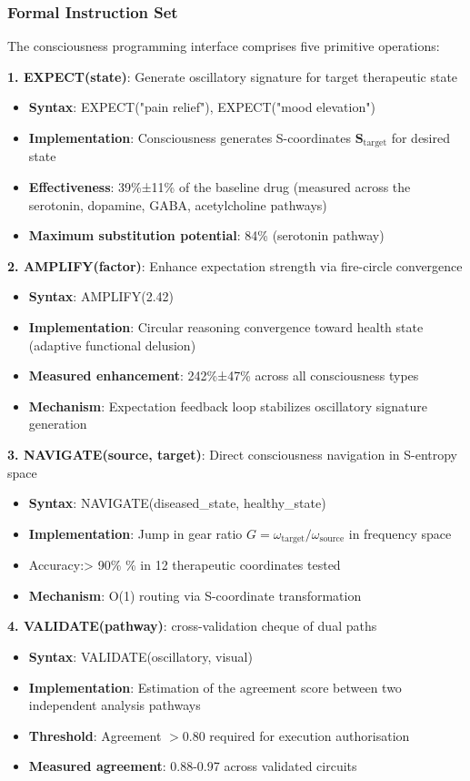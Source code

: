 \documentclass{article}
\theoremstyle{definition}
\theoremstyle{remark}
\begin{document}
\subsubsection{Formal Instruction Set}

The consciousness programming interface comprises five primitive operations:

\textbf{1. EXPECT(state)}: Generate oscillatory signature for target therapeutic state
\begin{itemize}
\item \textbf{Syntax}: EXPECT("pain relief"), EXPECT("mood elevation")
\item \textbf{Implementation}: Consciousness generates S-coordinates $\mathbf{S}_{\text{target}}$ for desired state
\item \textbf{Effectiveness}: 39\%±11\% of the baseline drug (measured across the serotonin, dopamine, GABA, acetylcholine pathways)
\item \textbf{Maximum substitution potential}: 84\% (serotonin pathway)
\end{itemize}

\textbf{2. AMPLIFY(factor)}: Enhance expectation strength via fire-circle convergence
\begin{itemize}
\item \textbf{Syntax}: AMPLIFY(2.42)
\item \textbf{Implementation}: Circular reasoning convergence toward health state (adaptive functional delusion)
\item \textbf{Measured enhancement}: 242\%±47\% across all consciousness types
\item \textbf{Mechanism}: Expectation feedback loop stabilizes oscillatory signature generation
\end{itemize}

\textbf{3. NAVIGATE(source, target)}: Direct consciousness navigation in S-entropy space
\begin{itemize}
\item \textbf{Syntax}: NAVIGATE(diseased\_state, healthy\_state)
\item \textbf{Implementation}: Jump in gear ratio $G = \omega_{\text{target}} / \omega_{\text{source}}$ in frequency space
\item Accuracy:> 90\% \% in 12 therapeutic coordinates tested
\item \textbf{Mechanism}: O(1) routing via S-coordinate transformation
\end{itemize}

\textbf{4. VALIDATE(pathway)}: cross-validation cheque of dual paths
\begin{itemize}
\item \textbf{Syntax}: VALIDATE(oscillatory, visual)
\item \textbf{Implementation}: Estimation of the agreement score between two independent analysis pathways
\item \textbf{Threshold}: Agreement $>0.80$ required for execution authorisation
\item \textbf{Measured agreement}: 0.88-0.97 across validated circuits
\end{itemize}
\end{document}
